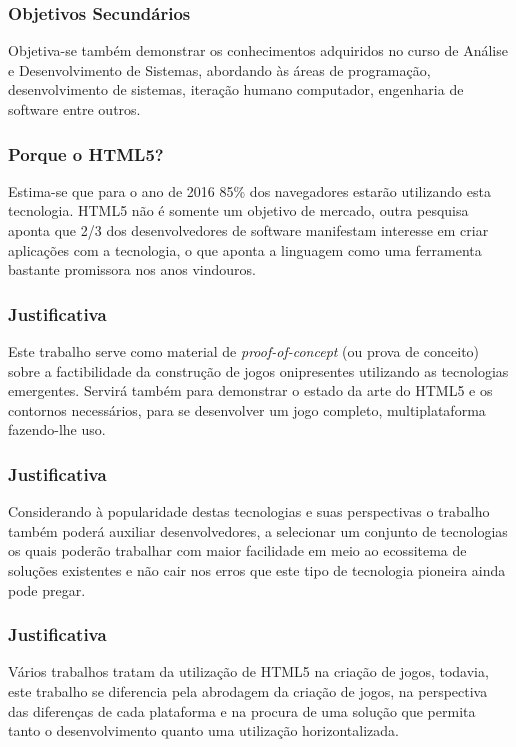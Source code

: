 \documentclass{beamer}
\begin{document}
\begin{frame}
\frametitle{Objetivos Secundários}

Objetiva-se também demonstrar os conhecimentos adquiridos no curso de Análise e Desenvolvimento de Sistemas, abordando às áreas de programação, desenvolvimento de sistemas, iteração humano computador, engenharia de software entre outros.

\end{frame}

\begin{frame}
\frametitle{Porque o HTML5?}

Estima-se que para o ano de 2016 85\% dos navegadores estarão utilizando esta tecnologia. HTML5 não é somente um objetivo de mercado, outra pesquisa aponta que 2/3 dos desenvolvedores de software manifestam interesse em criar aplicações com a tecnologia, o que aponta a linguagem como uma ferramenta bastante promissora nos anos vindouros. 

\end{frame}


\begin{frame}
\frametitle{Justificativa}

Este trabalho serve como material de \textit{proof-of-concept} (ou prova de conceito) sobre a factibilidade da construção de jogos onipresentes utilizando as tecnologias emergentes. 
Servirá também para demonstrar o estado da arte do HTML5 e os contornos necessários, para se desenvolver um jogo completo, multiplataforma fazendo-lhe uso.

\end{frame}

\begin{frame}
\frametitle{Justificativa}

Considerando à popularidade destas tecnologias e suas perspectivas o trabalho também poderá auxiliar desenvolvedores, a selecionar um conjunto de tecnologias os quais poderão trabalhar com maior facilidade em meio ao ecossitema de soluções existentes e não cair nos erros que este tipo de tecnologia pioneira ainda pode pregar.

\end{frame}


\begin{frame}
\frametitle{Justificativa}
Vários trabalhos tratam da utilização de HTML5 na criação de jogos, todavia, este trabalho se diferencia pela abrodagem da criação de jogos, na perspectiva das diferenças de cada plataforma e na procura de uma solução que permita tanto o desenvolvimento quanto uma utilização horizontalizada.

\end{frame}
\end{document}
